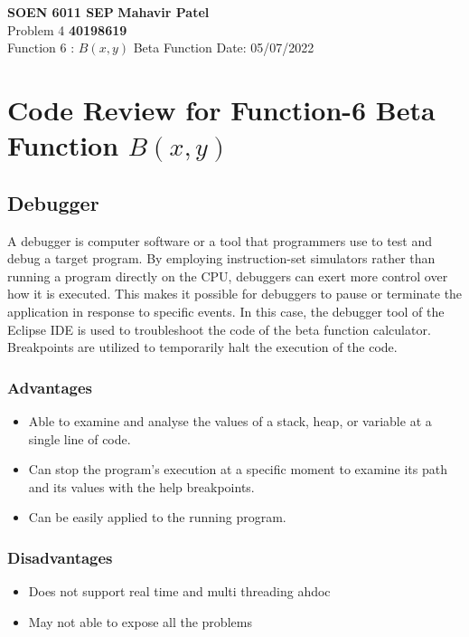 \documentclass[a4paper, 12pt]{article}
\begin{document}
\noindent
\large\textbf{SOEN 6011 SEP} \hfill \textbf{Mahavir Patel} \\
\normalsize Problem 4 \hfill \textbf{40198619} \\
Function 6 :  $B(x,y)$ Beta Function \hfill Date: 05/07/2022 \\


\section*{Code Review for Function-6 Beta Function $B(x,y)$}
\subsection*{Debugger}
A debugger is computer software or a tool that programmers use to test and debug a target program. By employing instruction-set simulators rather than running a program directly on the CPU, debuggers can exert more control over how it is executed. This makes it possible for debuggers to pause or terminate the application in response to specific events. In this case, the debugger tool of the Eclipse IDE is used to troubleshoot the code of the beta function calculator. Breakpoints are utilized to temporarily halt the execution of the code. \\
\subsubsection*{Advantages}
    \begin{itemize}[noitemsep]
        \item Able to examine and analyse the values of a stack, heap, or variable at a single line of code.
        \item Can stop the program's execution at a specific moment to examine its path and its values with the help breakpoints.
        \item Can be easily applied to the running program.
    \end{itemize}
\subsubsection*{Disadvantages}
     \begin{itemize}[noitemsep]
        \item Does not support real time and multi threading ahdoc
        \item May not able to expose all the problems
    \end{itemize}
\end{document}
